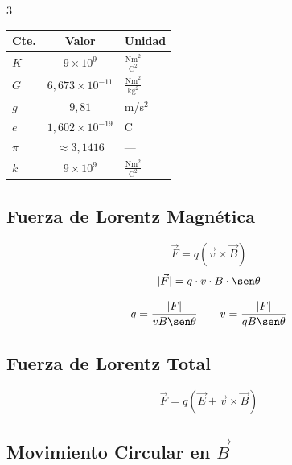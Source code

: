 \documentclass[9pt, landscape, letterpaper]{extarticle}
\begin{document}
\begin{multicols}{3}
  \begin{tablabox}
    \tablacompacta
    \begin{tabular}{@{}lcl@{}}
      \toprule
      Cte.  & Valor                     & Unidad                            \\
      \midrule
      $K$   & $9 \times 10^9$           & $\frac{\text{Nm}^2}{\text{C}^2}$  \\[3pt]
      $G$   & $6{,}673 \times 10^{-11}$ & $\frac{\text{Nm}^2}{\text{kg}^2}$ \\[3pt]
      $g$   & $9{,}81$                  & m/s$^2$                           \\[3pt]
      $e$   & $1{,}602 \times 10^{-19}$ & C                                 \\[3pt]
      $\pi$ & $\approx 3{,}1416$        & ---                               \\[3pt]
      $k$   & $9 \times 10^9$           & $\frac{\text{Nm}^2}{\text{C}^2}$  \\
      \bottomrule
    \end{tabular}
  \end{tablabox}

  \subsection{Fuerza de Lorentz Magnética}

  \begin{formulabox}
    $$\vec{F} = q\left(\vec{v} \times \vec{B}\right)$$
    $$|\vec{F}| = q \cdot v \cdot B \cdot \sen\theta$$
  \end{formulabox}

  \begin{despejesbox}[Despejes]
    $$q = \frac{|F|}{v B \sen\theta} \qquad v = \frac{|F|}{q B \sen\theta}$$
  \end{despejesbox}

  \subsection{Fuerza de Lorentz Total}

  \begin{formulabox}
    $$\vec{F} = q\left(\vec{E} + \vec{v} \times \vec{B}\right)$$
  \end{formulabox}

  \subsection{Movimiento Circular en $\vec{B}$}


\end{multicols}
\end{document}
